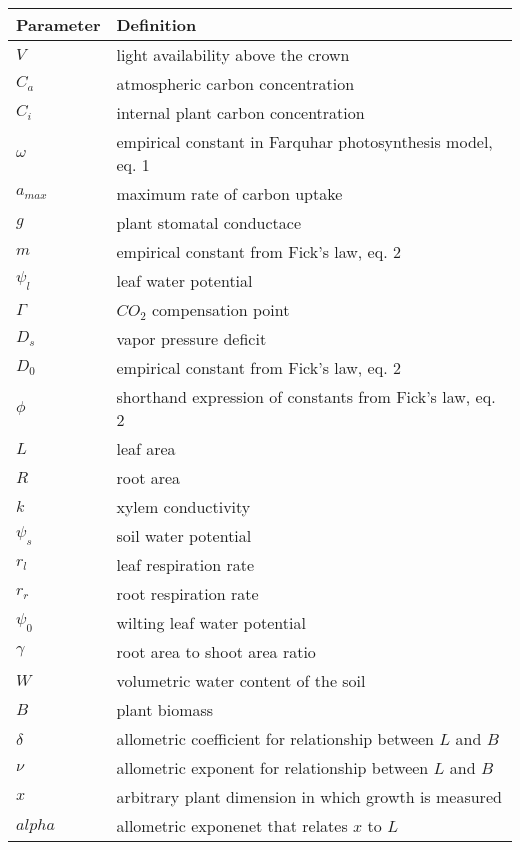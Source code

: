 \documentclass{article}
\begin{document}
  \begin{table}
    \begin{tabular}{ll}
      \toprule
      \textbf{Parameter} & \textbf{Definition} \\
      \midrule
      $V$ & light availability above the crown \\
      $C_{a}$ & atmospheric carbon concentration \\
      $C_{i}$ & internal plant carbon concentration \\
      $\omega$ & empirical constant in Farquhar photosynthesis model, eq.
                 1 \\
      $a_{max}$ & maximum rate of carbon uptake \\
      $g$ & plant stomatal conductace \\
      $m$ & empirical constant from Fick's law, eq. 2 \\
      $\psi_{l}$ & leaf water potential \\
      $\Gamma$ & $CO_{2}$ compensation point \\
      $D_{s}$ & vapor pressure deficit \\
      $D_{0}$ & empirical constant from Fick's law, eq. 2 \\
      $\phi$ & shorthand expression of constants from Fick's law, eq. 2 \\
      $L$ & leaf area \\
      $R$ & root area \\
      $k$ & xylem conductivity \\
      $\psi_{s}$ & soil water potential \\
      $r_{l}$ & leaf respiration rate \\
      $r_{r}$ & root respiration rate \\
      $\psi_{0}$ & wilting leaf water potential \\
      $\gamma$ & root area to shoot area ratio \\
      $W$ & volumetric water content of the soil \\
      $B$ & plant biomass \\
      $\delta$ & allometric coefficient for relationship between $L$ and $B$ \\
      $\nu$ & allometric exponent for relationship between $L$ and $B$ \\
      $x$ & arbitrary plant dimension in which growth is measured \\
      $alpha$ & allometric exponenet that relates $x$ to $L$ \\

\end{tabular}
\end{table}
\end{document}
